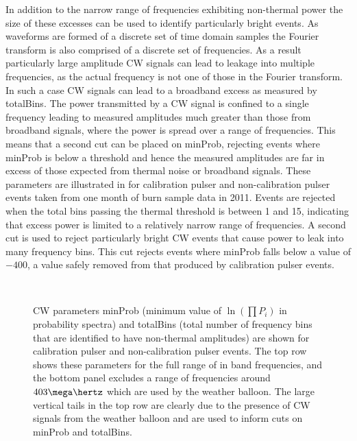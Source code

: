 In addition to the narrow range of frequencies exhibiting non-thermal power the size of these excesses can be used to identify particularly bright events. As waveforms are formed of a discrete set of time domain samples the Fourier transform is also comprised of a discrete set of frequencies. As a result particularly large amplitude CW signals can lead to leakage into multiple frequencies, as the actual frequency is not one of those in the Fourier transform. In such a case CW signals can lead to a broadband excess as measured by totalBins. The power transmitted by a CW signal is confined to a single frequency leading to measured amplitudes much greater than those from broadband signals, where the power is spread over a range of frequencies. This means that a second cut can be placed on minProb, rejecting events where minProb is below a threshold and hence the measured amplitudes are far in excess of those expected from thermal noise or broadband signals. These parameters are illustrated in  for calibration pulser and non-calibration pulser events taken from one month of burn sample data in 2011. Events are rejected when the total bins passing the thermal threshold is between 1 and 15, indicating that excess power is limited to a relatively narrow range of frequencies. A second cut is used to reject particularly bright CW events that cause power to leak into many frequency bins. This cut rejects events where minProb falls below a value of $-400$, a value safely removed from that produced by calibration pulser events. 


\begin{figure}[htpb]
  \hfill
  \\
  \hfill
  \caption{CW parameters minProb (minimum value of $\ln(\prod P_{i})$ in probability spectra) and totalBins (total number of frequency bins that are identified to have non-thermal amplitudes) are shown for calibration pulser and non-calibration pulser events. The top row shows these parameters for the full range of in band frequencies, and the bottom panel excludes a range of frequencies around $403 \mega \hertz$ which are used by the weather balloon. The large vertical tails in the top row are clearly due to the presence of CW signals from the weather balloon and are used to inform cuts on minProb and totalBins.}
  \label{fig:analysis:CWRemoval:Filtering:CW-MinProb-TotalBins}
\end{figure}


